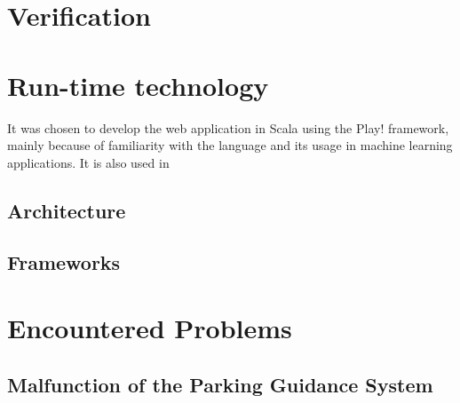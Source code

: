 \documentclass[journal,10pt]{IEEEtran}
\begin{document}
\section{Verification}





\section{Run-time technology}

It was chosen to develop the web application in Scala using the Play! framework, mainly because of familiarity with the language and its usage in machine learning applications. It is also used in  

\subsection{Architecture}\label{sec:architecture}


\subsection{Frameworks}\label{sec:frameworks}


\section{Encountered Problems}\label{sec:challenges}
\subsection{Malfunction of the Parking Guidance System}

\end{document}
